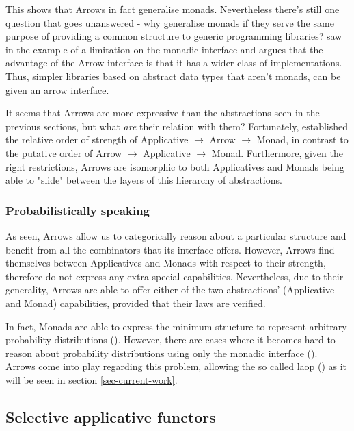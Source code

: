 \documentclass[
  oneside,
  11pt, a4paper,
  footinclude=true,
  headinclude=true,
  cleardoublepage=empty
]{scrbook}
\theoremstyle{definition}
\theoremstyle{definition}
\begin{document}
                This shows that Arrows in fact generalise monads. Nevertheless there's still one question that goes unanswered - why generalise monads if they serve the same purpose of providing a common structure to generic programming libraries? \cite{Hughes:2000:GMA:347238.347246} saw in the example of \cite{swiestra&duponcheel} a limitation on the monadic interface and argues that the advantage of the Arrow interface is that it has a wider class of implementations. Thus, simpler libraries based on abstract data types that aren't monads, can be given an arrow interface.
                
                It seems that Arrows are more expressive than the abstractions seen in the previous sections, but what \emph{are} their relation with them? Fortunately, \cite{Lindley:2011:IOA:1953652.1954016} established the relative order of strength of Applicative $\rightarrow$ Arrow $\rightarrow$ Monad, in contrast to the putative order of Arrow $\rightarrow$ Applicative $\rightarrow$ Monad. Furthermore, given the right restrictions, Arrows are isomorphic to both Applicatives and Monads being able to "slide" between the layers of this hierarchy of abstractions.
    	        
    	        \subsubsection{Probabilistically speaking}
    	        
    	        As seen, Arrows allow us to categorically reason about a particular structure and benefit from all the combinators that its interface offers. However, Arrows find themselves between Applicatives and Monads with respect to their strength, therefore do not express any extra special capabilities. Nevertheless, due to their generality, Arrows are able to offer either of the two abstractions' (Applicative and Monad) capabilities, provided that their laws are verified.
    	        
    	        In fact, Monads are able to express the minimum structure to represent arbitrary probability distributions (\cite{jtobin}). However, there are cases where it becomes hard to reason about probability distributions using only the monadic interface (\cite{Oliveira2016KeepDC}). Arrows come into play regarding this problem, allowing the so called \gls{laop} (\cite{Macedo2012MatricesAA}) as it will be seen in section \ref{sec-current-work}.
    	        
	    \subsection{Selective applicative functors}
	    
\end{document}
